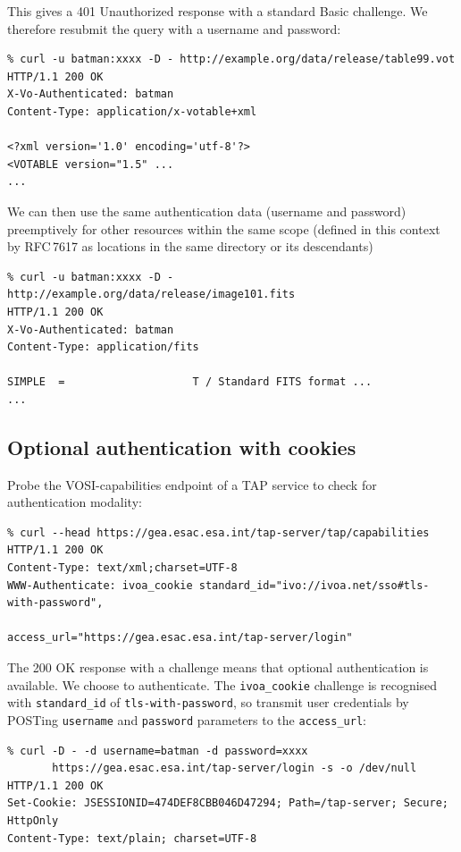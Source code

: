 \documentclass[11pt,a4paper]{ivoa}
\newcommand{\rfc}[1]{RFC\,#1}
\begin{document}
\noindent
This gives a 401 Unauthorized response
with a standard Basic challenge.
We therefore resubmit the query with a username and password:
{\footnotesize
\begin{verbatim}
% curl -u batman:xxxx -D - http://example.org/data/release/table99.vot
HTTP/1.1 200 OK
X-Vo-Authenticated: batman
Content-Type: application/x-votable+xml

<?xml version='1.0' encoding='utf-8'?>
<VOTABLE version="1.5" ...
...
\end{verbatim}
}

\noindent
We can then use the same authentication data (username and password)
preemptively for other resources within the same scope
(defined in this context by \rfc{7617} as locations in the same
directory or its descendants)
{\footnotesize
\begin{verbatim}
% curl -u batman:xxxx -D - http://example.org/data/release/image101.fits
HTTP/1.1 200 OK
X-Vo-Authenticated: batman
Content-Type: application/fits

SIMPLE  =                    T / Standard FITS format ...
...
\end{verbatim}
}


\subsection{Optional authentication with cookies}

Probe the VOSI-capabilities endpoint of a TAP service to check
for authentication modality:
{\footnotesize
\begin{verbatim}
% curl --head https://gea.esac.esa.int/tap-server/tap/capabilities
HTTP/1.1 200 OK
Content-Type: text/xml;charset=UTF-8
WWW-Authenticate: ivoa_cookie standard_id="ivo://ivoa.net/sso#tls-with-password",
                              access_url="https://gea.esac.esa.int/tap-server/login"
\end{verbatim}
}

\noindent
The 200 OK response with a challenge means that optional authentication
is available.
We choose to authenticate.
The \verb|ivoa_cookie| challenge is recognised with \verb|standard_id|
of \verb|tls-with-password|, so transmit user credentials
by POSTing \verb|username| and \verb|password| parameters
to the \verb|access_url|:
{\footnotesize
\begin{verbatim}
% curl -D - -d username=batman -d password=xxxx
       https://gea.esac.esa.int/tap-server/login -s -o /dev/null
HTTP/1.1 200 OK
Set-Cookie: JSESSIONID=474DEF8CBB046D47294; Path=/tap-server; Secure; HttpOnly
Content-Type: text/plain; charset=UTF-8
\end{verbatim}
}
\end{document}
